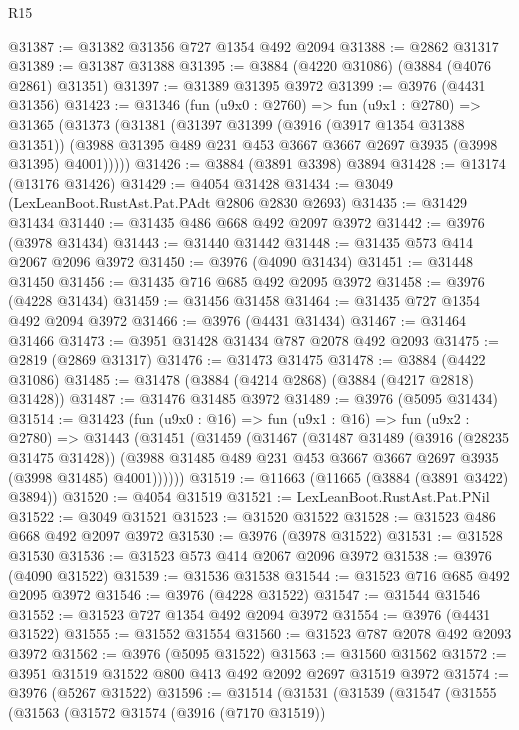 \begin{lexlean}{R15}
\begin{coremodule}
@31387 := @31382 @31356 @727 @1354 @492 @2094
@31388 := @2862 @31317
@31389 := @31387 @31388
@31395 := @3884 (@4220 @31086) (@3884 (@4076 @2861) @31351)
@31397 := @31389 @31395 @3972
@31399 := @3976 (@4431 @31356)
@31423 := @31346
    (fun (u9x0 : @2760) =>
    fun (u9x1 : @2780) =>
    @31365
      (@31373
        (@31381
          (@31397
            @31399
            (@3916 (@3917 @1354 @31388 @31351))
            (@3988 @31395 @489 @231 @453 @3667 @3667 @2697 @3935 (@3998 @31395) @4001)))))
@31426 := @3884 (@3891 @3398) @3894
@31428 := @13174 (@13176 @31426)
@31429 := @4054 @31428
@31434 := @3049 (LexLeanBoot.RustAst.Pat.PAdt @2806 @2830 @2693)
@31435 := @31429 @31434
@31440 := @31435 @486 @668 @492 @2097 @3972
@31442 := @3976 (@3978 @31434)
@31443 := @31440 @31442
@31448 := @31435 @573 @414 @2067 @2096 @3972
@31450 := @3976 (@4090 @31434)
@31451 := @31448 @31450
@31456 := @31435 @716 @685 @492 @2095 @3972
@31458 := @3976 (@4228 @31434)
@31459 := @31456 @31458
@31464 := @31435 @727 @1354 @492 @2094 @3972
@31466 := @3976 (@4431 @31434)
@31467 := @31464 @31466
@31473 := @3951 @31428 @31434 @787 @2078 @492 @2093
@31475 := @2819 (@2869 @31317)
@31476 := @31473 @31475
@31478 := @3884 (@4422 @31086)
@31485 := @31478 (@3884 (@4214 @2868) (@3884 (@4217 @2818) @31428))
@31487 := @31476 @31485 @3972
@31489 := @3976 (@5095 @31434)
@31514 := @31423
    (fun (u9x0 : @16) =>
    fun (u9x1 : @16) =>
    fun (u9x2 : @2780) =>
    @31443
      (@31451
        (@31459
          (@31467
            (@31487
              @31489
              (@3916 (@28235 @31475 @31428))
              (@3988 @31485 @489 @231 @453 @3667 @3667 @2697 @3935 (@3998 @31485) @4001))))))
@31519 := @11663 (@11665 (@3884 (@3891 @3422) @3894))
@31520 := @4054 @31519
@31521 := LexLeanBoot.RustAst.Pat.PNil
@31522 := @3049 @31521
@31523 := @31520 @31522
@31528 := @31523 @486 @668 @492 @2097 @3972
@31530 := @3976 (@3978 @31522)
@31531 := @31528 @31530
@31536 := @31523 @573 @414 @2067 @2096 @3972
@31538 := @3976 (@4090 @31522)
@31539 := @31536 @31538
@31544 := @31523 @716 @685 @492 @2095 @3972
@31546 := @3976 (@4228 @31522)
@31547 := @31544 @31546
@31552 := @31523 @727 @1354 @492 @2094 @3972
@31554 := @3976 (@4431 @31522)
@31555 := @31552 @31554
@31560 := @31523 @787 @2078 @492 @2093 @3972
@31562 := @3976 (@5095 @31522)
@31563 := @31560 @31562
@31572 := @3951 @31519 @31522 @800 @413 @492 @2092 @2697 @31519 @3972
@31574 := @3976 (@5267 @31522)
@31596 := @31514
    (@31531
      (@31539
        (@31547
          (@31555
            (@31563
              (@31572
                @31574
                (@3916 (@7170 @31519))

\end{coremodule}
\end{lexlean}
